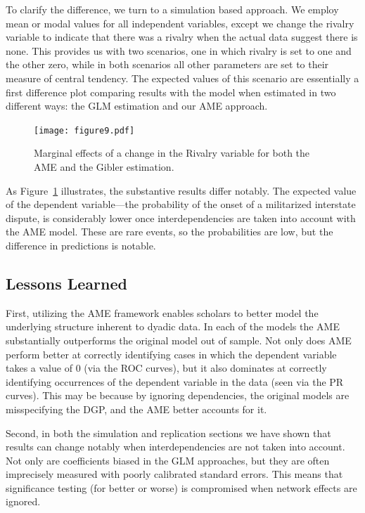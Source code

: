 \documentclass[12pt]{amsart}
\begin{document}
To clarify the difference, we turn to a simulation based approach. We employ mean or modal values for all independent variables, except we change the rivalry variable to indicate that there was a rivalry when the actual data suggest there is none. This provides us with two scenarios, one in which rivalry is set to one and the other zero, while in both scenarios all other parameters are set to their measure of central tendency. The expected values of this scenario are essentially a first difference plot comparing results with the model when estimated in two different ways: the GLM estimation and our AME approach.

\begin{figure}
	\caption{Marginal effects of a change in the Rivalry variable for both the AME and the Gibler estimation.  \label{fig:gibmargeff}}
	\texttt{[image: figure9.pdf]}
 	\label{fig:gibmargeff}
 \end{figure}

As Figure~\ref{fig:gibmargeff} illustrates, the substantive results differ notably. The expected value of the dependent variable---the probability of the onset of a militarized interstate dispute, is considerably lower once interdependencies are taken into account with the AME model.  These are rare events, so the probabilities are low, but the difference in predictions is notable.

\subsection{Lessons Learned}

First, utilizing the AME framework enables scholars to better model the underlying structure inherent to dyadic data. In each of the models the AME substantially outperforms the original model out of sample. Not only does AME perform better at correctly identifying cases in which the dependent variable takes a value of $0$ (via the ROC curves), but it also dominates at correctly identifying occurrences of the dependent variable in the data (seen via the PR curves). This may be because by ignoring dependencies, the original models are misspecifying the DGP, and the AME better accounts for it.

Second, in both the simulation  and replication sections  we have shown that results can change notably when interdependencies are not taken into account. Not only are coefficients biased in the GLM approaches, but they are often imprecisely measured with poorly calibrated standard errors.  This means that significance testing (for better or worse) is compromised when network effects are ignored.
\end{document}
